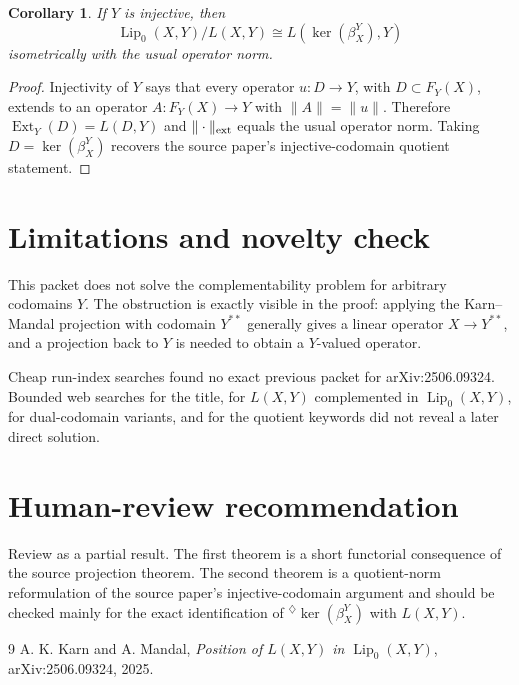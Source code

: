 \documentclass[11pt]{article}
\newtheorem{corollary}{Corollary}
\DeclareMathOperator{\Lip}{Lip}
\DeclareMathOperator{\Ext}{Ext}
\begin{document}
\begin{corollary}
If \(Y\) is injective, then
\[
  \Lip_0(X,Y)/L(X,Y)
  \cong L(\ker(\beta_X^Y),Y)
\]
isometrically with the usual operator norm.
\end{corollary}

\begin{proof}
Injectivity of \(Y\) says that every operator \(u:D\to Y\), with
\(D\subset F_Y(X)\), extends to an operator \(A:F_Y(X)\to Y\) with
\(\|A\|=\|u\|\). Therefore \(\Ext_Y(D)=L(D,Y)\) and
\(\|\cdot\|_{\rm ext}\) equals the usual operator norm. Taking
\(D=\ker(\beta_X^Y)\) recovers the source paper's injective-codomain
quotient statement.
\end{proof}

\section*{Limitations and novelty check}

This packet does not solve the complementability problem for arbitrary
codomains \(Y\). The obstruction is exactly visible in the proof: applying
the Karn--Mandal projection with codomain \(Y^{**}\) generally gives a
linear operator \(X\to Y^{**}\), and a projection back to \(Y\) is needed to
obtain a \(Y\)-valued operator.

Cheap run-index searches found no exact previous packet for arXiv:2506.09324.
Bounded web searches for the title, for \(L(X,Y)\) complemented in
\(\Lip_0(X,Y)\), for dual-codomain variants, and for the quotient keywords
did not reveal a later direct solution.

\section*{Human-review recommendation}

Review as a partial result. The first theorem is a short functorial
consequence of the source projection theorem. The second theorem is a
quotient-norm reformulation of the source paper's injective-codomain
argument and should be checked mainly for the exact identification of
\({}^{\diamondsuit}\ker(\beta_X^Y)\) with \(L(X,Y)\).

\begin{thebibliography}{9}
A. K. Karn and A. Mandal,
\emph{Position of \(L(X,Y)\) in \(\Lip_0(X,Y)\)},
arXiv:2506.09324, 2025.
\end{thebibliography}
\end{document}
